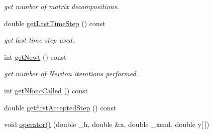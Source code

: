 \begin{DoxyCompactItemize}
\begin{DoxyCompactList}\small\item\em get number of matrix decompositions. \end{DoxyCompactList}\item 
double \hyperlink{classodes_1_1Radau5cc_a84f2521afde22fe621a92526e5f402b8}{get\-Last\-Time\-Step} () const 
\begin{DoxyCompactList}\small\item\em get last time step used. \end{DoxyCompactList}\item 
int \hyperlink{classodes_1_1Radau5cc_a9dd359045cfe3667949697176a2be296}{get\-Newt} () const 
\begin{DoxyCompactList}\small\item\em get number of Newton iterations performed. \end{DoxyCompactList}\item 
int \hyperlink{classodes_1_1Radau5cc_a49eecba7aba4da1dca5fe5f3848cab34}{get\-Nfonc\-Called} () const 
\item 
double \hyperlink{classodes_1_1Radau5cc_a44a8f7a188fc1171f059ffcebbf15de2}{getfirst\-Accepted\-Step} () const 
\item 
void \hyperlink{classodes_1_1Radau5cc_aee81c868cdc434f266e495a72689cec5}{operator()} (double \-\_\-h, double \&x, double \-\_\-xend, double y\mbox{[}$\,$\mbox{]})
\end{DoxyCompactItemize}
